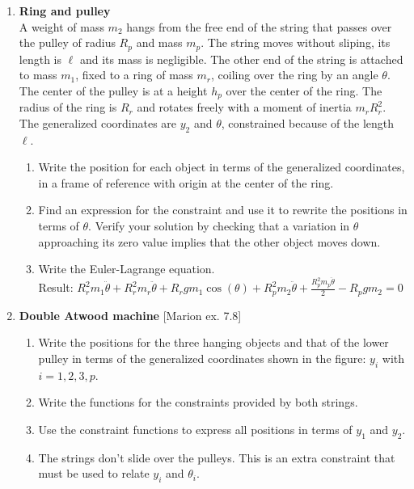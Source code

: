 \documentclass[11pt, a4paper, twoside]{article}
\begin{document}
\begin{enumerate}
	\item 
	\begin{minipage}[t][6cm]{0.57\textwidth}
		\textbf{Ring and pulley}\\
		A weight of mass \(m_2\) hangs from the free end of the string that passes over the pulley of radius \(R_{p}\) and mass \(m_{p}\).
		The string moves without sliping, its length is \(\ell\) and its mass is negligible.
		The other end of the string is attached to mass \(m_1\), fixed to a ring of mass \(m_{r}\), coiling over the ring by an angle \(\theta\).
		The center of the pulley is at a height \(h_{p}\) over the center of the ring. The radius of the ring is \(R_{r}\) and rotates freely with a moment of inertia \(m_{r} R_{r}^2\).
		The generalized coordinates are \(y_{2}\) and \(\theta\), constrained because of the length \(\ell\).
	\end{minipage}
	\begin{minipage}[c][1.5cm][t]{0.2\textwidth}
		
	\end{minipage}
	\begin{enumerate}
		\item Write the position for each object in terms of the generalized coordinates, in a frame of reference with origin at the center of the ring.
		\item Find an expression for the constraint and use it to rewrite the positions in terms of \(\theta\).
		Verify your solution by checking that a variation in \(\theta\) approaching its zero value implies that the other object moves down.
		\item Write the Euler-Lagrange equation.\\
		Result:
		\(
		R_{r}^{2} m_1 \ddot{\theta} + R_{r}^{2} m_{r} \ddot{\theta} + R_{r} g m_1 \cos{\left(\theta \right)} + R_{p}^{2} m_{2} \ddot{\theta} + \frac{R_{p}^{2} m_{p} \ddot{\theta}}{2} - R_{p} g m_{2} = 0
		\)
	\end{enumerate}


	\item
	\begin{minipage}[t][6.8cm]{0.67\textwidth}
		\textbf{Double Atwood machine} [Marion ex. 7.8]\\ 
		\begin{enumerate}
			\item Write the positions for the three hanging objects and that of the lower pulley in terms of the generalized coordinates shown in the figure: \(y_i\) with \(i = 1,2,3,p\). 
			\item Write the functions for the constraints provided by both strings.
			\item Use the constraint functions to express all positions in terms of \(y_1\) and \(y_2\).
			\item The strings don't slide over the pulleys. This is an extra constraint that must be used to relate \(y_i\) and \(\theta_i\).
		\end{enumerate}
	\end{minipage}
	\begin{minipage}[c][0cm][t]{0.3\textwidth}
		
	\end{minipage}


\end{enumerate}
\end{document}
